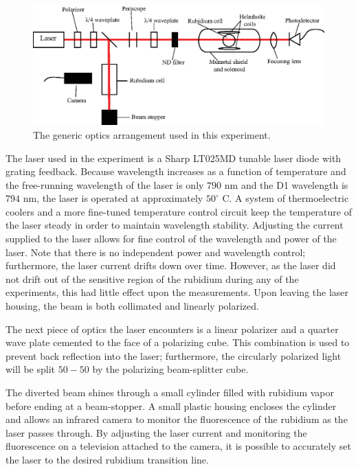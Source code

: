 \begin{figure}[htbp]
\begin{center}
\includegraphics[width=6.5in]{./figures/optics1.eps}
\caption{\small{The generic optics arrangement used in this experiment.}}
\label{fig:optics1}
\end{center}
\end{figure}


The laser used in the experiment is a Sharp LT025MD tunable laser diode with grating feedback. Because wavelength increases as a function of temperature and the free-running wavelength of the laser is only $790$ nm and the D1 wavelength is $794$ nm, the laser is operated at approximately $50^{\circ}$ C. A system of thermoelectric coolers and a more fine-tuned temperature control circuit keep the temperature of the laser steady in order to maintain wavelength stability. Adjusting the current supplied to the laser allows for fine control of the wavelength and power of the laser. Note that there is no independent power and wavelength control; furthermore, the laser current drifts down over time. However, as the laser did not drift out of the sensitive region of the rubidium during any of the experiments, this had little effect upon the measurements. Upon leaving the laser housing, the beam is both collimated and linearly polarized.

The next piece of optics the laser encounters is a linear polarizer and a quarter wave plate cemented to the face of a polarizing cube. This combination is used to prevent back reflection into the laser; furthermore, the circularly polarized light will be split $50-50$ by the polarizing beam-splitter cube. 

The diverted beam shines through a small cylinder filled with rubidium vapor before ending at a beam-stopper. A small plastic housing encloses the cylinder and allows an infrared camera to monitor the fluorescence of the rubidium as the laser passes through. By adjusting the laser current and monitoring the fluorescence on a television attached to the camera, it is possible to accurately set the laser to the desired rubidium transition line.

